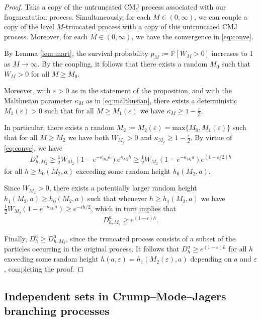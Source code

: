 \documentclass[a4,12pt]{amsart}
\numberwithin{equation}{section}
\begin{document}
\begin{proof}
	Take a copy of the untruncated CMJ process associated with our fragmentation process. 
	Simultaneously, for each $M \in (0,\infty)$, we can couple a copy of the level 
	$M$-truncated process with a copy of this untruncated CMJ process. 
	Moreover, for each $M \in (0,\infty)$, we have the convergence in \eqref{eq:conve}. 

	By Lemma \ref{lem:mart}, the survival probability $p_M := \mathbb{P}[ W_M > 0]$ increases to $1$ as $M \to \infty$. 
	By the coupling, it follows that there exists a random $M_0$ such that $W_M > 0$ for all $M \geq M_0$. 

	Moreover, with $\varepsilon > 0$ as in the statement of the proposition, and with the Malthusian parameter $\kappa_M$ as in \eqref{eq:malthusian}, there exists a deterministic $M_1(\varepsilon) > 0$ such that for all $M \geq M_1(\varepsilon)$ we have $\kappa_M \geq 1- \tfrac{\varepsilon}{2}$.

In particular, there exists a random $M_2 := M_2(\varepsilon) = \mathrm{max} \{ M_0, M_1(\varepsilon) \}$ such that for all $M \geq M_2$ we have both $W_{M_2} > 0$ and $\kappa_{M_2} \geq 1- \tfrac{\varepsilon}{2}$. By virtue of \eqref{eq:conve}, we have
\begin{align*}
D_{h,M_2}^a  \geq \frac{1}{2} W_{M_2}   (1 - e^{ - \kappa_{M_2} a }) e^{  \kappa_{M_2} h } \geq \frac{1}{2} W_{M_2}  (1 - e^{ - \kappa_{M_2} a }) e^{  (1-\varepsilon/2) h } 
\end{align*}
for all $h \geq h_0(M_2,a)$ exceeding some random height $h_0(M_2,a)$. 


Since $W_{M_2} > 0$, there exists a potentially larger random height $h_1(M_2,a) \geq h_0(M_2,a)$ such that whenever $h \geq h_1(M_2,a)$ we have $\frac{1}{2} W_{M_2}  (1 - e^{ - \kappa_{M_2} a }) \geq e^{- \varepsilon h/2}$, which in turn implies that 
\begin{align*}
D_{h,M_2}^a  \geq  e^{  (1-\varepsilon) h }.
\end{align*}


Finally, $D_h^a \geq D_{h,M_2}^a$, since the truncated process consists of a subset of the particles occurring in the original process. It follows that $D_h^a \geq e^{(1-\varepsilon)h}$ for all $h$ exceeding some random height $h(a,\varepsilon) = h_1(M_2(\varepsilon),a)$ depending on $a$ and $\varepsilon$, completing the proof.
\end{proof}


\subsection{Independent sets in Crump--Mode--Jagers branching processes} \label{sec:independent}
\end{document}
